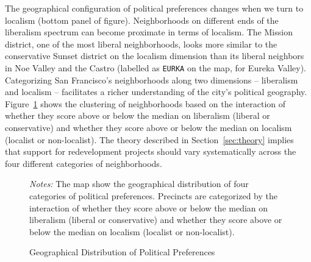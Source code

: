\documentclass[article,11pt]{memoir}
\begin{document}
The geographical configuration of political preferences changes when we turn to localism (bottom panel of figure).  Neighborhoods on different ends of the liberalism spectrum can become proximate in terms of localism.  The Mission district, one of the most liberal neighborhoods, looks more similar to the conservative Sunset district on the localism dimension than its liberal neighbors in Noe Valley and the Castro (labelled as \texttt{EURKA} on the map, for Eureka Valley).  Categorizing San Francisco's neighborhoods along two dimensions -- liberalism and localism -- facilitates a richer understanding of the city's political geography.  Figure~\ref{fig:g_map_types} shows the clustering of neighborhoods based on the interaction of whether they score above or below the median on liberalism (liberal or conservative) and whether they score above or below the median on localism (localist or non-localist).  The theory described in Section~\ref{sec:theory} implies that support for redevelopment projects should vary systematically across the four different categories of neighborhoods.

\begin{figure}[tb]\centering
  \caption{Geographical Distribution of Political Preferences}
  \label{fig:g_map_types}
  \begin{measuredfigure}
  \end{measuredfigure}
  \begin{tablenotes}[flushleft]
    \item \hspace{-.2em}\emph{Notes:} The map show the geographical distribution of four categories of political preferences. Precincts are categorized by the interaction of whether they score above or below the median on liberalism (liberal or conservative) and whether they score above or below the median on localism (localist or non-localist).
  \end{tablenotes}
\end{figure}
\end{document}
